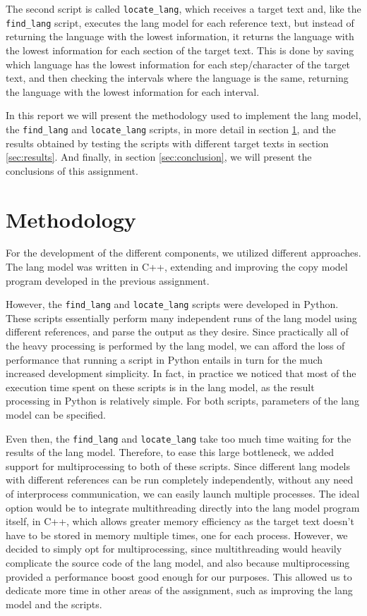 \documentclass{article}
\begin{document}
The second script is called \verb|locate_lang|, which receives a target text and, like the \verb|find_lang| script, executes the lang model for each reference text, but instead of returning the language with the lowest information, it returns the language with the lowest information for each section of the target text.
This is done by saving which language has the lowest information for each step/character of the target text, and then checking the intervals where the language is the same, returning the language with the lowest information for each interval.

In this report we will present the methodology used to implement the lang model, the \verb|find_lang| and \verb|locate_lang| scripts, in more detail in section \ref{sec:methodology}, and the results obtained by testing the scripts with different target texts in section \ref{sec:results}.
And finally, in section \ref{sec:conclusion}, we will present the conclusions of this assignment.

\section{Methodology}
\label{sec:methodology}

For the development of the different components, we utilized different approaches.
The lang model was written in C++, extending and improving the copy model program developed in the previous assignment.

However, the \verb|find_lang| and \verb|locate_lang| scripts were developed in Python.
These scripts essentially perform many independent runs of the lang model using different references, and parse the output as they desire.
Since practically all of the heavy processing is performed by the lang model, we can afford the loss of performance that running a script in Python entails in turn for the much increased development simplicity.
In fact, in practice we noticed that most of the execution time spent on these scripts is in the lang model, as the result processing in Python is relatively simple.
For both scripts, parameters of the lang model can be specified.

Even then, the \verb|find_lang| and \verb|locate_lang| take too much time waiting for the results of the lang model.
Therefore, to ease this large bottleneck, we added support for multiprocessing to both of these scripts.
Since different lang models with different references can be run completely independently, without any need of interprocess communication, we can easily launch multiple processes.
The ideal option would be to integrate multithreading directly into the lang model program itself, in C++, which allows greater memory efficiency as the target text doesn't have to be stored in memory multiple times, one for each process.
However, we decided to simply opt for multiprocessing, since multithreading would heavily complicate the source code of the lang model, and also because multiprocessing provided a performance boost good enough for our purposes.
This allowed us to dedicate more time in other areas of the assignment, such as improving the lang model and the scripts.
\end{document}
